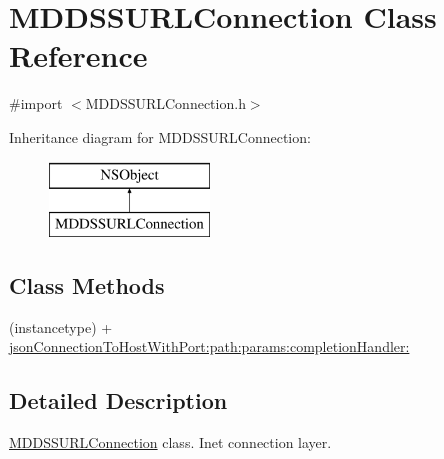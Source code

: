 \hypertarget{interface_m_d_d_s_s_u_r_l_connection}{\section{M\-D\-D\-S\-S\-U\-R\-L\-Connection Class Reference}
\label{interface_m_d_d_s_s_u_r_l_connection}
}


{\ttfamily \#import $<$M\-D\-D\-S\-S\-U\-R\-L\-Connection.\-h$>$}

Inheritance diagram for M\-D\-D\-S\-S\-U\-R\-L\-Connection\-:\begin{figure}[H]
\begin{center}
\leavevmode
\includegraphics[height=2.000000cm]{interface_m_d_d_s_s_u_r_l_connection}
\end{center}
\end{figure}
\subsection*{Class Methods}
\begin{DoxyCompactItemize}
\item 
(instancetype) + \hyperlink{interface_m_d_d_s_s_u_r_l_connection_a4adceb5901feaca4d9f185830628c552}{json\-Connection\-To\-Host\-With\-Port\-:path\-:params\-:completion\-Handler\-:}
\end{DoxyCompactItemize}


\subsection{Detailed Description}
\hyperlink{interface_m_d_d_s_s_u_r_l_connection}{M\-D\-D\-S\-S\-U\-R\-L\-Connection} class. Inet connection layer. 

